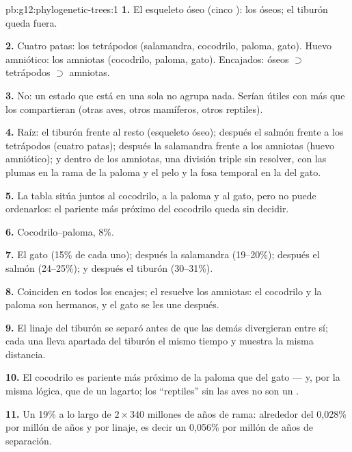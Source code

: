 \begin{solution}{pb:g12:phylogenetic-trees:1}
\textbf{1.} El esqueleto óseo (cinco ): los  óseos;
el tiburón queda fuera.

\textbf{2.} Cuatro patas: los tetrápodos (salamandra, cocodrilo,
paloma, gato). Huevo amniótico: los amniotas (cocodrilo, paloma,
gato). Encajados:  óseos $\supset$ tetrápodos $\supset$
amniotas.

\textbf{3.} No: un estado que está en una sola  no agrupa nada.
Serían útiles con más  que los compartieran (otras aves, otros
mamíferos, otros reptiles).

\textbf{4.} Raíz: el tiburón frente al resto (esqueleto óseo); después
el salmón frente a los tetrápodos (cuatro patas); después la salamandra
frente a los amniotas (huevo amniótico); y dentro de los amniotas, una
división triple sin resolver, con las plumas en la rama de la paloma y
el pelo y la fosa temporal en la del gato.

\textbf{5.} La tabla sitúa juntos al cocodrilo, a la paloma y al gato,
pero no puede ordenarlos: el pariente más próximo del cocodrilo queda
sin decidir.

\textbf{6.} Cocodrilo--paloma, 8\%.

\textbf{7.} El gato (15\% de cada uno); después la salamandra
(19--20\%); después el salmón (24--25\%); y después el tiburón
(30--31\%).

\textbf{8.} Coinciden en todos los encajes; el  resuelve los
amniotas: el cocodrilo y la paloma son hermanos, y el gato se les une
después.

\textbf{9.} El linaje del tiburón se separó antes de que las demás
divergieran entre sí; cada una lleva apartada del tiburón el mismo
tiempo y muestra la misma distancia.

\textbf{10.} El cocodrilo es pariente más próximo de la paloma que del
gato --- y, por la misma lógica, que de un lagarto; los ``reptiles''
sin las aves no son un .

\textbf{11.} Un 19\% a lo largo de $2 \times 340$ millones de años de
rama: alrededor del 0,028\% por millón de años y por linaje, es decir
un 0,056\% por millón de años de separación.


\end{solution}
